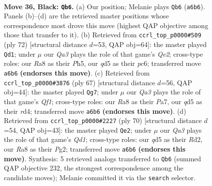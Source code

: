 \documentclass[11pt]{article}
\begin{document}
\clearpage

\begin{figure}[p]\centering
\begin{subfigure}{0.46\textwidth}\centering
\resizebox{\linewidth}{!}{%
\newchessgame
\chessboard[
  setfen={r5k1/1p3p2/q5p1/p2Q4/7p/7P/P3nPP1/bN5K b - - 0 36},
  showmover=false,
  pgfstyle=straightmove, color=movearrow, markmove={a6-b6}
]}
\caption{}
\end{subfigure}\hfill
\begin{subfigure}{0.46\textwidth}\centering
\resizebox{\linewidth}{!}{%
\newchessgame
\chessboard[
  setfen={5k2/1p3p2/2p5/3P1qpP/p1P5/5P2/1P2QK2/8 w - - 1 37},
  showmover=false,
  pgfstyle=straightmove, color=movearrow, markmove={e2-d1}
]}
\caption{}
\end{subfigure}
\\[4pt]
\begin{subfigure}{0.46\textwidth}\centering
\resizebox{\linewidth}{!}{%
\newchessgame
\chessboard[
  setfen={5q1k/p7/1p1pQ2p/6p1/P2R4/1P5P/1KP2r2/8 b - - 1 34},
  showmover=false,
  pgfstyle=straightmove, color=movearrow, markmove={f8-g7}
]}
\caption{}
\end{subfigure}\hfill
\begin{subfigure}{0.46\textwidth}\centering
\resizebox{\linewidth}{!}{%
\newchessgame
\chessboard[
  setfen={6k1/6p1/1q2p2p/2r1p3/3p3P/1P3P2/P2R2P1/1K1Q4 w - - 0 36},
  showmover=false,
  pgfstyle=straightmove, color=movearrow, markmove={d1-e2}
]}
\caption{}
\end{subfigure}
\caption{\textbf{Move 36, Black: \texttt{Qb6}.} (a) Our position; Melanie plays \texttt{Qb6} (\texttt{a6b6}). Panels (b)--(d) are the retrieved master positions whose correspondence most drove this move (highest QAP objective among those that transfer to it). (b) Retrieved from \texttt{ccrl\_top\_p0000\#509} (ply 72) [structural distance $d$=53, QAP obj=64]: the master played \texttt{Qd1}; under $\mu$ our \emph{Qa3} plays the role of that game's \emph{Qe2}; cross-type roles: our \emph{R}a8 as their \emph{P}h5, our \emph{q}d5 as their \emph{p}c6; transferred move \texttt{a6b6} \textbf{(endorses this move)}. (c) Retrieved from \texttt{ccrl\_top\_p0000\#3876} (ply 67) [structural distance $d$=56, QAP obj=44]: the master played \texttt{Qg7}; under $\mu$ our \emph{Qa3} plays the role of that game's \emph{Qf1}; cross-type roles: our \emph{R}a8 as their \emph{P}a7, our \emph{q}d5 as their \emph{r}d4; transferred move \texttt{a6b6} \textbf{(endorses this move)}. (d) Retrieved from \texttt{ccrl\_top\_p0000\#2227} (ply 70) [structural distance $d$=54, QAP obj=43]: the master played \texttt{Qe2}; under $\mu$ our \emph{Qa3} plays the role of that game's \emph{Qd1}; cross-type roles: our \emph{q}d5 as their \emph{R}d2, our \emph{R}a8 as their \emph{P}g2; transferred move \texttt{a6b6} \textbf{(endorses this move)}. Synthesis: 5 retrieved analogs transferred to \texttt{Qb6} (summed QAP objective 232, the strongest correspondence among the candidate moves); Melanie committed it via the \texttt{search} selector.}
\label{fig:thought-m71}
\end{figure}
\end{document}
